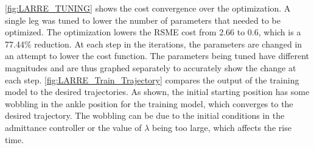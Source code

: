 \autoref{fig:LARRE_TUNING} shows the cost convergence over the optimization. A single leg was tuned to lower the number of parameters that needed to be optimized. The optimization lowers the RSME cost from 2.66 to 0.6, which is a 77.44\% reduction. At each step in the iterations, the parameters are changed in an attempt to lower the cost function. The parameters being tuned have different magnitudes and are thus graphed separately to accurately show the change at each step. \autoref{fig:LARRE_Train_Trajectory} compares the output of the training model to the desired trajectories.  As shown, the initial starting position has some wobbling in the ankle position for the training model, which converges to the desired trajectory. The wobbling can be due to the initial conditions in the admittance controller or the value of $\lambda$ being too large, which affects the rise time.  

